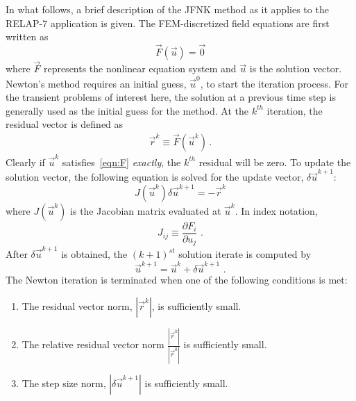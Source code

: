 In what follows, a brief description of the JFNK method as it
applies to the RELAP-7 application is given.  The FEM-discretized field
equations are first written as
\begin{equation}
  \label{eqn:F}
  \vec{F} (\vec{u}) = \vec{0}
\end{equation}
where $\vec{F}$ represents the nonlinear equation system and $\vec{u}$
is the solution vector. Newton's method requires an initial guess,
$\vec{u}^0$, to start the iteration process. For the transient
problems of interest here, the solution at a previous time step is
generally used as the initial guess for the method. At the $k^{th}$
iteration, the residual vector is defined as
\begin{align}
  \vec{r}^k \equiv \vec{F}(\vec{u}^k) \,.
\end{align}
Clearly if $\vec{u}^k$ satisfies~\eqref{eqn:F} \emph{exactly}, the
$k^{th}$ residual will be zero.  To update the solution vector, the
following equation is solved for the update vector, $\delta
\vec{u}^{k+1}$:
\begin{equation}
  \label{eqn:newton_correction}
J (\vec{u}^k) \delta \vec{u}^{k+1} = - \vec{r}^k
\end{equation}
where $J(\vec{u}^k)$ is the Jacobian
matrix evaluated at $\vec{u}^k$.  In index notation,
\begin{equation}
  \label{eqn:jacobian_matrix}
  J_{ij} \equiv \frac {\partial F_i} {\partial u_j} \,\,.
\end{equation}
After $\delta \vec{u}^{k+1}$ is obtained, the $(k+1)^{st}$ solution iterate
is computed by
\begin{equation}
  \vec{u}^{k+1} = \vec{u}^{k} + \delta \vec{u}^{k+1} \,\,.
\end{equation}
The Newton iteration is terminated when one of the following conditions is met:
\begin{enumerate}
\item The residual vector norm, $|\vec{r}^k|$, is sufficiently small.
\item The relative residual vector norm $\frac{|\vec{r}^k|}{|\vec{r}^0|}$  is sufficiently small.
\item The step size norm, $|\delta \vec{u}^{k+1}|$ is sufficiently small.
\end{enumerate}


